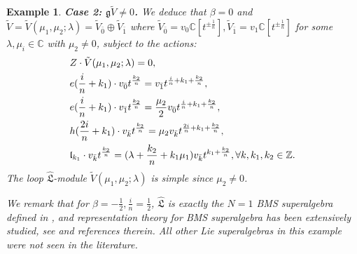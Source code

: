 \documentclass[1p]{elsarticle}
\numberwithin{equation}{section}
\def\fL{\mathfrak{L}}
\def\bC{\mathbb{C}}
\def\bZ{\mathbb{Z}}
\def\fl{\mathfrak{l}}
\def\hL{\hat{\fL}}
\newtheorem{exam}{Example}
\begin{document}
\begin{exam}
  {\bf Case 2: $\mathfrak{g} \tilde V\ne0$.} We deduce that $\beta=0$ and $ \tilde V= \tilde V(\mu_1,\mu_2; \lambda)= \tilde V_{\bar 0}\oplus  \tilde V_{\bar 1}$ where $\tilde V_{\bar 0}=  v_0\bC[t^{\pm \frac1n}],    \tilde V_{\bar 1}=  v_1\bC[t^{\pm \frac1n}]$  for some $\lambda,\mu_i\in\bC$ with $\mu_2\ne0$, subject to the actions:
   $$\aligned &Z\cdot \tilde V(\mu_1,\mu_2; \lambda) =0, \\
   & e(\frac {i}n+k_1)\cdot v_{\bar 0}t^{\frac{k_2}n}= v_{\bar 1}t^{\frac {i}n+k_1+\frac{k_2}n}, \\
   &e(\frac {i}n+k_1)\cdot v_{\bar 1}t^{\frac{k_2}n}= \frac{\mu_2}2v_{\bar 0}t^{\frac {i}n+k_1+\frac{k_2}n},\\ &h(\frac {2i}n+k_1)\cdot v_{\bar k}t^{\frac{k_2}{n}}=\mu_2v_{\bar k}t^{\frac {2i}n+k_1+\frac{k_2}{n}},\\
  &\fl_{k_1}\cdot v_{\bar k}t^{\frac{k_2}{n}}=(\lambda+\frac{k_2}{n}+k_1\mu_1)v_{\bar k}t^{ {k_1}+\frac{k_2}{n}}, \forall k, k_1, k_2\in\bZ.
  \endaligned$$
  The loop $\hL$-module $\tilde V(\mu_1, \mu_2; \lambda)$ is simple since $\mu_2\ne0$.
  

  
  We remark that for $\beta=-\frac 12,\frac in=\frac 12$, $\hL$ is exactly the $N=1$ BMS superalgebra defined in \cite{BBM}, and representation theory for BMS superalgebra has been extensively studied, see \cite{LPXZ2} and references therein. All other Lie superalgebras in this example were not seen in the literature.
\end{exam}
\end{document}
